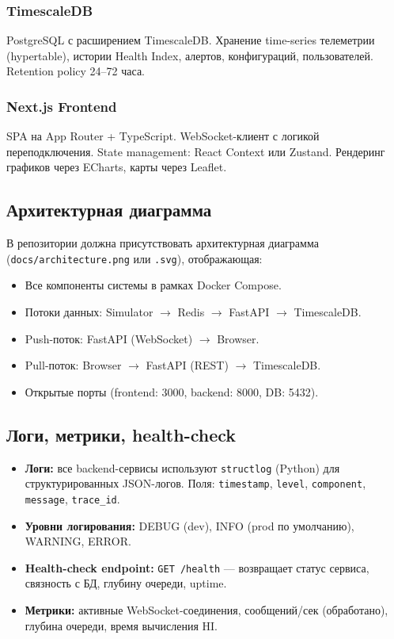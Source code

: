 \documentclass[12pt,a4paper]{article}
\newcommand{\code}[1]{\texttt{#1}}
\begin{document}
\subsubsection*{TimescaleDB}
PostgreSQL с расширением TimescaleDB. Хранение time-series телеметрии (hypertable), истории Health Index, алертов, конфигураций, пользователей. Retention policy 24--72 часа.

\subsubsection*{Next.js Frontend}
SPA на App Router + TypeScript. WebSocket-клиент с логикой переподключения. State management: React Context или Zustand. Рендеринг графиков через ECharts, карты через Leaflet.

\subsection{Архитектурная диаграмма}
\label{sec:arch-diagram}

В репозитории должна присутствовать архитектурная диаграмма (\code{docs/architecture.png} или \code{.svg}), отображающая:

\begin{itemize}[nosep]
  \item Все компоненты системы в рамках Docker Compose.
  \item Потоки данных: Simulator $\to$ Redis $\to$ FastAPI $\to$ TimescaleDB.
  \item Push-поток: FastAPI (WebSocket) $\to$ Browser.
  \item Pull-поток: Browser $\to$ FastAPI (REST) $\to$ TimescaleDB.
  \item Открытые порты (frontend: 3000, backend: 8000, DB: 5432).
\end{itemize}

\subsection{Логи, метрики, health-check}

\begin{itemize}[nosep]
  \item \textbf{Логи:} все backend-сервисы используют \code{structlog} (Python) для структурированных JSON-логов. Поля: \code{timestamp}, \code{level}, \code{component}, \code{message}, \code{trace\_id}.
  \item \textbf{Уровни логирования:} DEBUG (dev), INFO (prod по умолчанию), WARNING, ERROR.
  \item \textbf{Health-check endpoint:} \code{GET /health} --- возвращает статус сервиса, связность с БД, глубину очереди, uptime.
  \item \textbf{Метрики:} активные WebSocket-соединения, сообщений/сек (обработано), глубина очереди, время вычисления HI.
\end{itemize}
\end{document}
